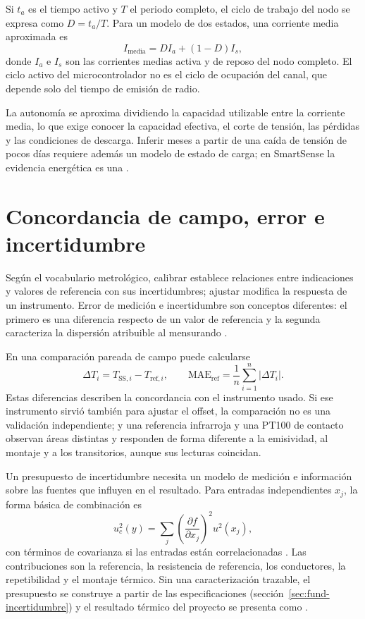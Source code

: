 Si $t_a$ es el tiempo activo y $T$ el periodo completo, el ciclo de trabajo del nodo se expresa como $D=t_a/T$. Para un modelo de dos estados, una corriente media aproximada es
\begin{equation}
I_{\mathrm{media}}=D I_a+(1-D)I_s,
\label{eq:marco-corriente-media}
\end{equation}
donde $I_a$ e $I_s$ son las corrientes medias activa y de reposo del nodo completo. El ciclo activo del microcontrolador no es el ciclo de ocupación del canal, que depende solo del tiempo de emisión de radio.

La autonomía se aproxima dividiendo la capacidad utilizable entre la corriente media, lo que exige conocer la capacidad efectiva, el corte de tensión, las pérdidas y las condiciones de descarga. Inferir meses a partir de una caída de tensión de pocos días requiere además un modelo de estado de carga; en SmartSense la evidencia energética es una \EstadoAutonomia{}.

\section{Concordancia de campo, error e incertidumbre}
\label{sec:marco-metrologia}
Según el vocabulario metrológico, calibrar establece relaciones entre indicaciones y valores de referencia con sus incertidumbres; ajustar modifica la respuesta de un instrumento. Error de medición e incertidumbre son conceptos diferentes: el primero es una diferencia respecto de un valor de referencia y la segunda caracteriza la dispersión atribuible al mensurando \citep{jcgm2012}.

En una comparación pareada de campo puede calcularse
\begin{equation}
\Delta T_i=T_{\mathrm{SS},i}-T_{\mathrm{ref},i},
\qquad
\mathrm{MAE}_{\mathrm{ref}}=\frac{1}{n}\sum_{i=1}^{n}|\Delta T_i|.
\label{eq:marco-concordancia}
\end{equation}
Estas diferencias describen la concordancia con el instrumento usado. Si ese instrumento sirvió también para ajustar el offset, la comparación no es una validación independiente; y una referencia infrarroja y una PT100 de contacto observan áreas distintas y responden de forma diferente a la emisividad, al montaje y a los transitorios, aunque sus lecturas coincidan.

Un presupuesto de incertidumbre necesita un modelo de medición e información sobre las fuentes que influyen en el resultado. Para entradas independientes $x_j$, la forma básica de combinación es
\begin{equation}
u_c^2(y)=\sum_j\left(\frac{\partial f}{\partial x_j}\right)^2u^2(x_j),
\label{eq:marco-incertidumbre}
\end{equation}
con términos de covarianza si las entradas están correlacionadas \citep{jcgm2008}. Las contribuciones son la referencia, la resistencia de referencia, los conductores, la repetibilidad y el montaje térmico. Sin una caracterización trazable, el presupuesto se construye a partir de las especificaciones (sección~\ref{sec:fund-incertidumbre}) y el resultado térmico del proyecto se presenta como \EstadoTemperatura{}.
